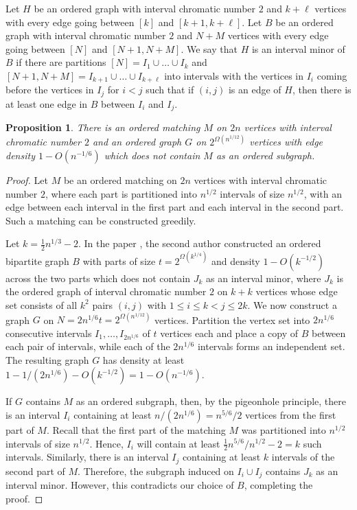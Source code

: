 \documentclass[11pt]{article}
\newtheorem{proposition}[theorem]{Proposition}
\begin{document}
Let $H$ be an ordered graph with interval chromatic number $2$ and $k+\ell$ vertices with every edge going between $[k]$ and $[k+1,k+\ell]$. Let $B$ be an ordered graph with interval chromatic number $2$ and $N+M$ vertices with every edge going between $[N]$ and $[N+1,N+M]$. We say that $H$ is an interval minor of $B$ if there are partitions $[N]=I_1 \cup \dots \cup I_k$ and $[N+1,N+M]=I_{k+1} \cup \dots \cup I_{k+\ell}$ into intervals with the vertices in $I_i$ coming before the vertices in $I_j$ for $i<j$ such that if $(i,j)$ is an edge of $H$, then there is at least one edge in $B$ between $I_i$ and $I_j$. 


\begin{proposition} 
There is an ordered matching $M$ on $2n$ vertices with interval chromatic number $2$ and an ordered graph $G$ on $2^{\Omega(n^{1/12})}$ vertices with edge density $1-O(n^{-1/6})$ which does not contain $M$ as an ordered subgraph. 
\end{proposition} 

\begin{proof}
Let $M$ be an ordered matching on $2n$ vertices with interval chromatic number $2$, where each part is partitioned into $n^{1/2}$ intervals of size $n^{1/2}$, with an edge between each interval in the first part and each interval in the second part. Such a matching can be constructed greedily. 

Let $k=\frac{1}{2}n^{1/3} -2$. In the paper \cite{F13}, the second author constructed an ordered bipartite graph $B$ with parts of size $t=2^{\Omega(k^{1/4})}$ and density $1-O(k^{-1/2})$ across the two parts which does not contain $J_k$ as an interval minor, where $J_k$ is the ordered graph of interval chromatic number $2$ on $k+k$ vertices whose edge set consists of all $k^2$ pairs $(i,j)$ with $1 \leq i \leq k < j \leq 2k$. We now construct a graph $G$ on $N=2n^{1/6} t = 2^{\Omega(n^{1/12})}$ vertices.
Partition the vertex set into $2n^{1/6}$ consecutive intervals $I_1, \ldots, I_{2n^{1/6}}$ of $t$ vertices each and place a copy of $B$ between each pair of intervals, while each of the $2n^{1/6}$ intervals forms an independent set. The resulting graph $G$ has density at least $1-1/(2n^{1/6})-O(k^{-1/2})=1-O(n^{-1/6})$. 

If $G$ contains $M$ as an ordered subgraph, then, by the pigeonhole principle, there is an interval $I_i$ containing at least $n/(2n^{1/6})=n^{5/6}/2$ vertices from the first part of $M$. Recall that the first part of the matching $M$ was partitioned into $n^{1/2}$ intervals of size $n^{1/2}$. Hence, $I_i$ will contain at least $\frac{1}{2}n^{5/6}/n^{1/2} - 2 = k$ such intervals. Similarly, there is an interval $I_j$ containing at least $k$ intervals of the second part of $M$. Therefore, the subgraph induced on $I_i \cup I_j$ contains $J_k$ as an interval minor. However, this contradicts our choice of $B$, completing the proof. 
\end{proof}
\end{document}
